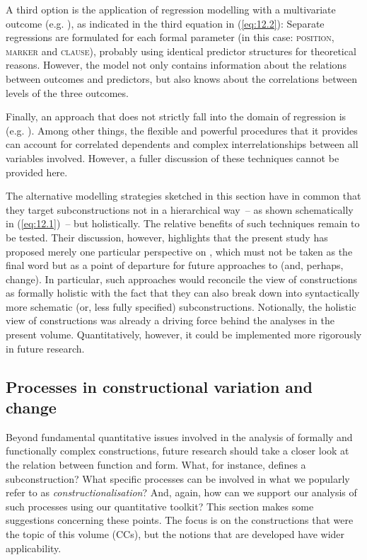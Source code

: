 A third option is the application of regression modelling with a multivariate outcome (e.g. \citealt{AfifiEtAl2020,JohnsonWichern2007}), as indicated in the third equation in (\ref{eq:12.2}): Separate regressions are formulated for each formal parameter (in this case: \textsc{position}, \textsc{marker} and \textsc{clause}), probably using identical predictor structures for theoretical reasons. However, the model not only contains information about the relations between outcomes and predictors, but also knows about the correlations between levels of the three outcomes.

Finally, an approach that does not strictly fall into the domain of regression is  (e.g. \citealt{Hoyle2012,Kaplan2009}). Among other things, the flexible and powerful procedures that it provides can account for correlated dependents and complex interrelationships between all variables involved. However, a fuller discussion of these techniques cannot be provided here.

The alternative modelling strategies sketched in this section have in common that they target subconstructions not in a hierarchical way~– as shown schematically in (\ref{eq:12.1})~– but holistically. The relative benefits of such techniques remain to be tested. Their discussion, however, highlights that the present study has proposed merely one particular perspective on , which must not be taken as the final word but as a point of departure for future approaches to  (and, perhaps, change). In particular, such approaches would reconcile the view of constructions as formally holistic with the fact that they can also break down into syntactically more schematic (or, less fully specified) subconstructions. Notionally, the holistic view of constructions was already a driving force behind the analyses in the present volume. Quantitatively, however, it could be implemented more rigorously in future research.

\subsection{\label{bkm:Ref82082423}Processes in constructional variation and change}\label{sec:12.3.3}

Beyond fundamental quantitative issues involved in the analysis of formally and functionally complex constructions, future research should take a closer look at the relation between function and form. What, for instance, defines a subconstruction? What specific processes can be involved in what we popularly refer to as \textit{constructionalisation}? And, again, how can we support our analysis of such processes using our quantitative toolkit? This section makes some suggestions concerning these points. The focus is on the constructions that were the topic of this volume (CCs), but the notions that are developed have wider applicability.

